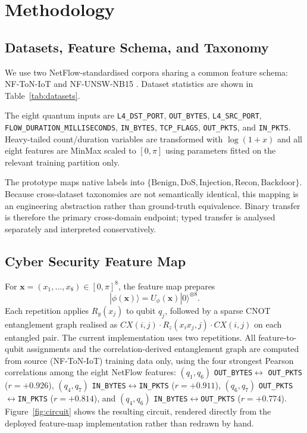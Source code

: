 \documentclass[conference]{IEEEtran}
\begin{document}
\section{Methodology}
\label{sec:methodology}

\subsection{Datasets, Feature Schema, and Taxonomy}
\label{subsec:datasets}

We use two NetFlow-standardised corpora sharing a common feature schema:
NF-ToN-IoT and NF-UNSW-NB15 \cite{sarhan2021, toniot}. Dataset statistics
are shown in Table~\ref{tab:datasets}.

The eight quantum inputs are \texttt{L4\_DST\_PORT}, \texttt{OUT\_BYTES},
\texttt{L4\_SRC\_PORT}, \texttt{FLOW\_DURATION\_MILLISECONDS},
\texttt{IN\_BYTES}, \texttt{TCP\_FLAGS}, \texttt{OUT\_PKTS}, and
\texttt{IN\_PKTS}. Heavy-tailed count/duration variables are transformed
with $\log(1+x)$ and all eight features are MinMax scaled to $[0,\pi]$
using parameters fitted on the relevant training partition only.

The prototype maps native labels into $\{\text{Benign}, \text{DoS},
\text{Injection}, \text{Recon}, \text{Backdoor}\}$. Because cross-dataset
taxonomies are not semantically identical, this mapping is an engineering
abstraction rather than ground-truth equivalence. Binary transfer is
therefore the primary cross-domain endpoint; typed transfer is analysed
separately and interpreted conservatively.

\subsection{Cyber Security Feature Map}
\label{subsec:featuremap}

For $\mathbf{x} = (x_1,\dots,x_8) \in [0,\pi]^8$, the feature map prepares
\begin{equation}
|\phi(\mathbf{x})\rangle = U_\phi(\mathbf{x})|0\rangle^{\otimes 8}.
\label{eq:featuremap}
\end{equation}
Each repetition applies $R_y(x_j)$ to qubit $q_j$, followed by a sparse
CNOT entanglement graph realised as $CX(i,j)\cdot R_z(x_i x_j, j)\cdot
CX(i,j)$ on each entangled pair. The current implementation uses two
repetitions. All feature-to-qubit assignments and the correlation-derived
entanglement graph are computed from source (NF-ToN-IoT) training data
only, using the four strongest Pearson correlations among the eight
NetFlow features: $(q_1,q_6)$ \texttt{OUT\_BYTES}$\leftrightarrow$
\texttt{OUT\_PKTS} ($r{=}{+}0.926$), $(q_4,q_7)$
\texttt{IN\_BYTES}$\leftrightarrow$\texttt{IN\_PKTS} ($r{=}{+}0.911$),
$(q_6,q_7)$ \texttt{OUT\_PKTS}$\leftrightarrow$\texttt{IN\_PKTS}
($r{=}{+}0.814$), and $(q_4,q_6)$
\texttt{IN\_BYTES}$\leftrightarrow$\texttt{OUT\_PKTS} ($r{=}{+}0.774$).
Figure~\ref{fig:circuit} shows the resulting circuit, rendered directly
from the deployed feature-map implementation rather than redrawn by hand.
\end{document}
